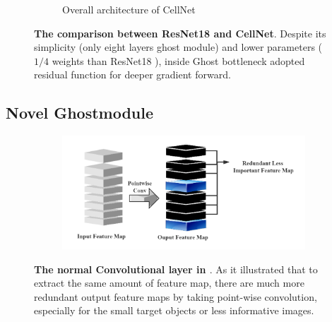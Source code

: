 \begin{figure}[h]
\begin{center}
\begin{subfigure}[t]{0.49\textwidth}
			\caption{Overall architecture of CellNet}
			\label{fig:cellnet}
		\end{subfigure}
	\end{center}
	\caption{\textbf{The comparison between ResNet18 \cite{20} and CellNet}. Despite its simplicity (only eight layers ghost module) and lower parameters ( $1/4$ weights than ResNet18 \cite{20}), inside Ghost bottleneck adopted residual function for deeper gradient forward.}
\end{figure}








\subsection{Novel Ghostmodule} %
\label{sub:amet}

\begin{figure}[h]
	\begin{center}
		\begin{subfigure}[b]{\textwidth}
		    \centering
			\includegraphics[width=\textwidth]{thesis-template-master/images/normal conv.png}
			
			\label{fig:cellnet}
		\end{subfigure}
	\end{center}
	\caption{\textbf{The normal Convolutional layer in \cite{26}\cite{27}\cite{28}}. As it illustrated that to extract the same amount of feature map, there are much more redundant output feature maps by taking point-wise convolution, especially for the small target objects or less informative images.}
\end{figure}



